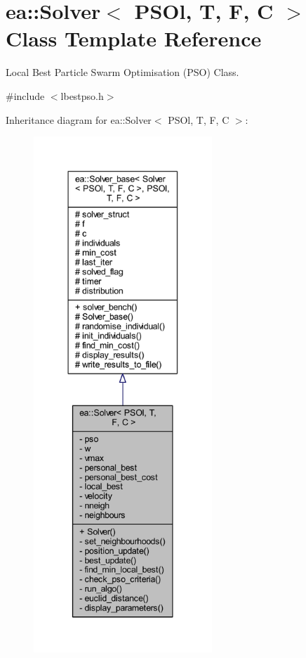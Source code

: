 \hypertarget{classea_1_1_solver_3_01_p_s_ol_00_01_t_00_01_f_00_01_c_01_4}{}\section{ea\+:\+:Solver$<$ P\+S\+Ol, T, F, C $>$ Class Template Reference}
\label{classea_1_1_solver_3_01_p_s_ol_00_01_t_00_01_f_00_01_c_01_4}


Local Best Particle Swarm Optimisation (P\+SO) Class.  




{\ttfamily \#include $<$lbestpso.\+h$>$}



Inheritance diagram for ea\+:\+:Solver$<$ P\+S\+Ol, T, F, C $>$\+:
\nopagebreak
\begin{figure}[H]
\begin{center}
\leavevmode
\includegraphics[height=550pt]{classea_1_1_solver_3_01_p_s_ol_00_01_t_00_01_f_00_01_c_01_4__inherit__graph}
\end{center}
\end{figure}
